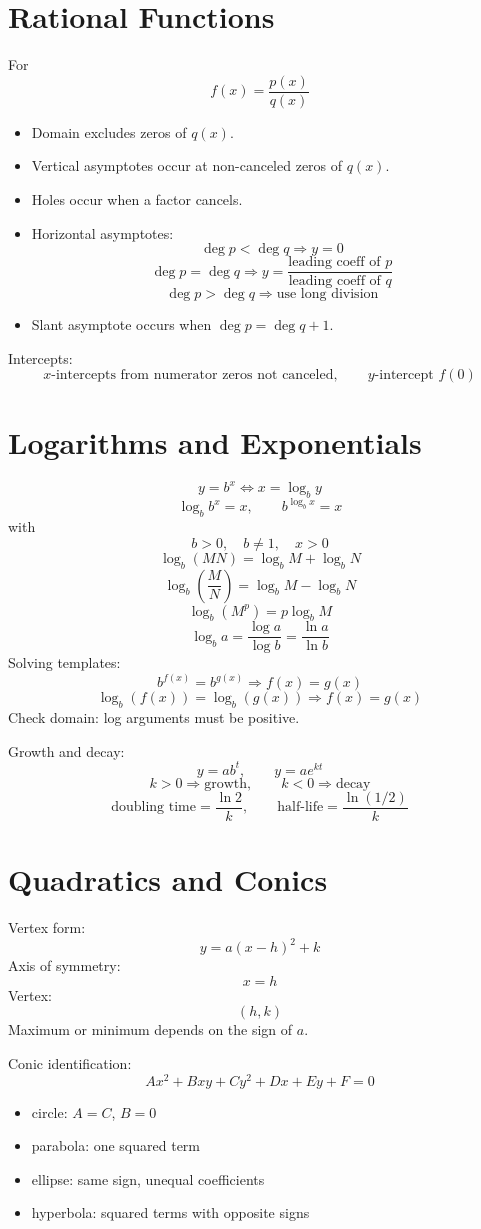 \documentclass[11pt]{article}
\begin{document}
\section*{Rational Functions}
For
\[
f(x)=\frac{p(x)}{q(x)}
\]
\begin{itemize}
  \item Domain excludes zeros of $q(x)$.
  \item Vertical asymptotes occur at non-canceled zeros of $q(x)$.
  \item Holes occur when a factor cancels.
  \item Horizontal asymptotes:
  \[
  \deg p<\deg q \Rightarrow y=0
  \]
  \[
  \deg p=\deg q \Rightarrow y=\frac{\text{leading coeff of }p}{\text{leading coeff of }q}
  \]
  \[
  \deg p>\deg q \Rightarrow \text{use long division}
  \]
  \item Slant asymptote occurs when $\deg p=\deg q+1$.
\end{itemize}
Intercepts:
\[
x\text{-intercepts from numerator zeros not canceled},\qquad y\text{-intercept }f(0)
\]

\section*{Logarithms and Exponentials}
\[
y=b^x \iff x=\log_b y
\]
\[
\log_b b^x=x,\qquad b^{\log_b x}=x
\]
with
\[
b>0,\quad b\ne 1,\quad x>0
\]
\[
\log_b(MN)=\log_bM+\log_bN
\]
\[
\log_b\!\left(\frac{M}{N}\right)=\log_bM-\log_bN
\]
\[
\log_b(M^p)=p\log_bM
\]
\[
\log_b a=\frac{\log a}{\log b}=\frac{\ln a}{\ln b}
\]
Solving templates:
\[
b^{f(x)}=b^{g(x)} \Rightarrow f(x)=g(x)
\]
\[
\log_b(f(x))=\log_b(g(x)) \Rightarrow f(x)=g(x)
\]
Check domain: log arguments must be positive.

Growth and decay:
\[
y=ab^t,\qquad y=ae^{kt}
\]
\[
k>0 \Rightarrow \text{growth},\qquad k<0 \Rightarrow \text{decay}
\]
\[
\text{doubling time}=\frac{\ln 2}{k},\qquad
\text{half-life}=\frac{\ln(1/2)}{k}
\]

\section*{Quadratics and Conics}
Vertex form:
\[
y=a(x-h)^2+k
\]
Axis of symmetry:
\[
x=h
\]
Vertex:
\[
(h,k)
\]
Maximum or minimum depends on the sign of $a$.

Conic identification:
\[
Ax^2+Bxy+Cy^2+Dx+Ey+F=0
\]
\begin{itemize}
  \item circle: $A=C$, $B=0$
  \item parabola: one squared term
  \item ellipse: same sign, unequal coefficients
  \item hyperbola: squared terms with opposite signs
\end{itemize}
\end{document}
